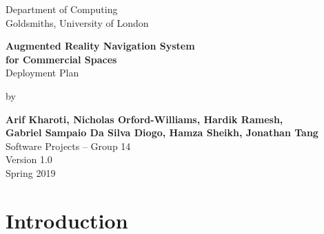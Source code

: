 \documentclass[12pt]{article}
\begin{document}
\begin{titlepage}
    \begin{center}
        \vspace*{1cm}
        Department of Computing\\
        Goldsmiths, University of London\\

        \vspace*{3.25cm}

        \textbf{\LARGE Augmented Reality Navigation System\\}
        \vspace*{0.20cm}           
        \textbf{\LARGE for Commercial Spaces}\\
        \vspace*{0.55cm}           
        {\large Deployment Plan}\\
        \vspace*{0.15cm}           

        \vspace*{2cm}
        by\\
        \vspace*{0.25cm}   

        \textbf{Arif Kharoti, Nicholas Orford-Williams, Hardik Ramesh,\\}
        \textbf{Gabriel Sampaio Da Silva Diogo, Hamza Sheikh, Jonathan Tang\\}
        \vspace*{0.1cm}    
        Software Projects – Group 14\\  

        \vspace{2cm}
        Version 1.0\\
        Spring 2019
        \vfill


        \vspace{1.5cm}

    \end{center}
\end{titlepage}


\section{Introduction}
\end{document}
